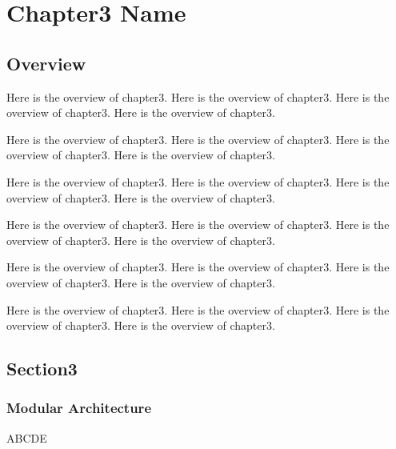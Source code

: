 \ifx\allfiles\undefined
	
\else
	
\fi
\chapter{Chapter3 Name}
\section{Overview}
Here is the overview of chapter3. Here is the overview of chapter3. Here is the overview of chapter3. Here is the overview of chapter3.

Here is the overview of chapter3. Here is the overview of chapter3. Here is the overview of chapter3. Here is the overview of chapter3.

Here is the overview of chapter3. Here is the overview of chapter3. Here is the overview of chapter3. Here is the overview of chapter3.

Here is the overview of chapter3. Here is the overview of chapter3. Here is the overview of chapter3. Here is the overview of chapter3.

Here is the overview of chapter3. Here is the overview of chapter3. Here is the overview of chapter3. Here is the overview of chapter3.

Here is the overview of chapter3. Here is the overview of chapter3. Here is the overview of chapter3. Here is the overview of chapter3.


\section{Section3}
\label{sec:ModularMRSystem}

\subsection{Modular Architecture}
ABCDE

\ifx\allfiles\undefined
	\onehalfspacing
	
	
	
\fi